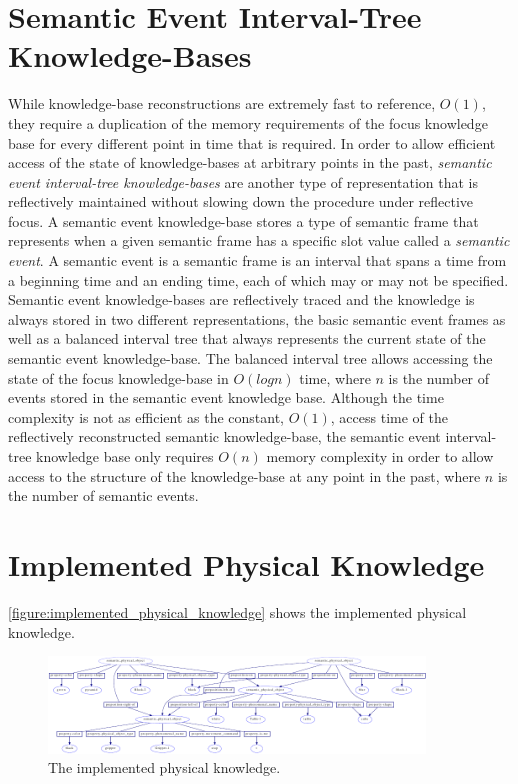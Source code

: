 \section{Semantic Event Interval-Tree Knowledge-Bases}

While knowledge-base reconstructions are extremely fast to reference,
$O(1)$, they require a duplication of the memory requirements of the
focus knowledge base for every different point in time that is
required.  In order to allow efficient access of the state of
knowledge-bases at arbitrary points in the past, \emph{semantic event
  interval-tree knowledge-bases} are another type of representation
that is reflectively maintained without slowing down the procedure
under reflective focus.  A semantic event knowledge-base stores a type
of semantic frame that represents when a given semantic frame has a
specific slot value called a \emph{semantic event}.  A semantic event
is a semantic frame is an interval that spans a time from a beginning
time and an ending time, each of which may or may not be specified.
Semantic event knowledge-bases are reflectively traced and the
knowledge is always stored in two different representations, the basic
semantic event frames as well as a balanced interval tree that always
represents the current state of the semantic event knowledge-base.
The balanced interval tree allows accessing the state of the focus
knowledge-base in $O(log n)$ time, where $n$ is the number of events
stored in the semantic event knowledge base.  Although the time
complexity is not as efficient as the constant, $O(1)$, access time of
the reflectively reconstructed semantic knowledge-base, the semantic
event interval-tree knowledge base only requires $O(n)$ memory
complexity in order to allow access to the structure of the
knowledge-base at any point in the past, where $n$ is the number of
semantic events.

\section{Implemented Physical Knowledge}

{\mbox{\autoref{figure:implemented_physical_knowledge}}} shows the
implemented physical knowledge.
\begin{figure}
\includegraphics[width=10cm]{gfx/implemented_physical_knowledge}
\caption[The implemented physical knowledge.]{The implemented physical
  knowledge.}
\label{figure:implemented_physical_knowledge}
\end{figure}

